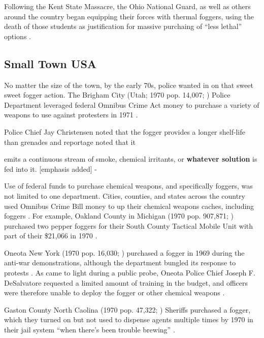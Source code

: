 \documentclass[
  12pt,
]{krantz}
\renewenvironment{quote}{\begin{VF}}{\end{VF}}
\begin{document}
Following the Kent State Massacre, the Ohio National Guard, as well as others around the country began equipping their forces with thermal foggers, using the death of those students as justification for massive purchaing of ``less lethal'' options \citep{Bandy1970}.

\hypertarget{small-town-usa}{%
\subsection*{Small Town USA}\label{small-town-usa}}


No matter the size of the town, by the early 70s, police wanted in on that sweet sweet fogger action.
The Brigham City (Utah; 1970 pop. 14,007; \citet{USCB1970}) Police Department leveraged federal Omnibus Crime Act money to purchase a variety of weapons to use against protesters in 1971 \citep{BoxElderAgencies1971}.

Police Chief Jay Christensen noted that the fogger provides a longer shelf-life than grenades and reportage noted that it

\begin{quote}
emits a continuous stream of smoke, chemical irritants, or \textbf{whatever solution} is fed into it. {[}emphasis added{]} - \citet{Robinson1972}
\end{quote}

Use of federal funds to purchase chemical weapons, and specifically foggers, was not limited to one department.
Cities, counties, and states across the country used Omnibus Crime Bill money to up their chemical weapons caches, including foggers \citep{Conheim1972}.
For example, Oakland County in Michigan (1970 pop. 907,871; \citet{USCB1970}) purchased two pepper foggers for their South County Tactical Mobile Unit with part of their \$21,066 in 1970 \citep{Conheim1972}.

Oneota New York (1970 pop. 16,030; \citet{USCB1970}) purchased a fogger in 1969 during the anti-war demonstrations, although the department bungled its response to protests \citep{Griffin1973}.
As came to light during a public probe, Oneota Police Chief Joseph F. DeSalvatore requested a limited amount of training in the budget, and officers were therefore unable to deploy the fogger or other chemical weapons \citep{Griffin1973}.

Gaston County North Caolina (1970 pop. 47,322; \citet{USCB1970}) Sheriffs purchased a fogger, which they turned on but not used to dispense agents multiple times by 1970 in their jail system ``when there's been trouble brewing'' \citep{Balloch1970}.
\end{document}
